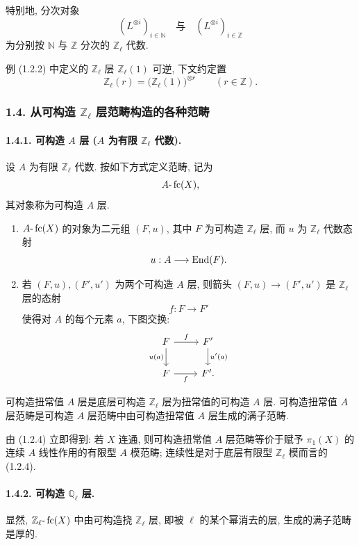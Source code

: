 特别地, 分次对象
\[
(L^{\otimes i})_{i\in\mathbb N}\quad\text{与}\quad(L^{\otimes i})_{i\in\mathbb Z}
\]
为分别按 \(\mathbb N\) 与 \(\mathbb Z\) 分次的 \(\mathbb Z_\ell\) 代数.

\begin{statement}{例}
(1.2.2) 中定义的 \(\mathbb Z_\ell\) 层 \(\mathbb Z_\ell(1)\) 可逆, 下文约定置
\[
\mathbb Z_\ell(r)=\bigl(\mathbb Z_\ell(1)\bigr)^{\otimes r}\qquad (r\in\mathbb Z).
\]
\end{statement}

\subsubsection*{1.4. 从可构造 \(\mathbb Z_\ell\) 层范畴构造的各种范畴}

\paragraph{1.4.1. 可构造 \(A\) 层 (\(A\) 为有限 \(\mathbb Z_\ell\) 代数).}
设 \(A\) 为有限 \(\mathbb Z_\ell\) 代数. 按如下方式定义范畴, 记为
\[
A\text{-}\operatorname{fc}(X),
\]
其对象称为可构造 \(A\) 层.

\begin{enumerate}[label=(\roman*)]
\item \(A\text{-}\operatorname{fc}(X)\) 的对象为二元组 \((F,u)\), 其中 \(F\) 为可构造 \(\mathbb Z_\ell\) 层, 而 \(u\) 为 \(\mathbb Z_\ell\) 代数态射
\[
u:A\longrightarrow \operatorname{End}(F).
\]
\item 若 \((F,u),(F',u')\) 为两个可构造 \(A\) 层, 则箭头 \((F,u)\to(F',u')\) 是 \(\mathbb Z_\ell\) 层的态射
\[
f:F\longrightarrow F'
\]
使得对 \(A\) 的每个元素 \(a\), 下图交换:
\[
\begin{tikzcd}
F \arrow[r,"f"] \arrow[d,"u(a)"'] & F' \arrow[d,"u'(a)"]\\
F \arrow[r,"f"'] & F'.
\end{tikzcd}
\]
\end{enumerate}

可构造扭常值 \(A\) 层是底层可构造 \(\mathbb Z_\ell\) 层为扭常值的可构造 \(A\) 层. 可构造扭常值 \(A\) 层范畴是可构造 \(A\) 层范畴中由可构造扭常值 \(A\) 层生成的满子范畴.

由 (1.2.4) 立即得到: 若 \(X\) 连通, 则可构造扭常值 \(A\) 层范畴等价于赋予 \(\pi_1(X)\) 的连续 \(A\) 线性作用的有限型 \(A\) 模范畴; 连续性是对于底层有限型 \(\mathbb Z_\ell\) 模而言的 (1.2.4).

\paragraph{1.4.2. 可构造 \(\mathbb Q_\ell\) 层.}
显然, \(\mathbb Z_\ell\text{-}\operatorname{fc}(X)\) 中由可构造挠 \(\mathbb Z_\ell\) 层, 即被 \(\ell\) 的某个幂消去的层, 生成的满子范畴是厚的.

